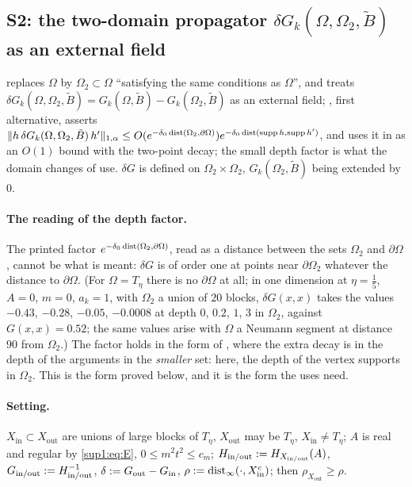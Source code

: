 
\subsection{S2: the two-domain propagator $\delta G_k(\Omega,\Omega_2,\tilde B)$ as an external field}\label{sup1:ssec:S2}

\cite[p.~414]{Ba3} replaces $\Omega$ by $\Omega_2\subset\Omega$ ``satisfying the same conditions as $\Omega$'', and treats $\delta G_k(\Omega,\Omega_2,\tilde B)=G_k(\Omega,\tilde B)-G_k(\Omega_2,\tilde B)$ as an external field; \cite[(2.5)]{Ba3}, first alternative, asserts $\lVert h\,\delta G_k(\Omega,\Omega_2,\tilde B)\,h'\rVert_{1,\alpha}\le O(e^{-\delta_0\operatorname{dist}(\Omega_2,\partial\Omega)})e^{-\delta_0\operatorname{dist}(\operatorname{supp} h,\operatorname{supp} h')}$, and \cite[p.~426]{Ba3} uses it in \cite[(2.13)]{Ba3} as an $O(1)$ bound with the two-point decay; the small depth factor is what the domain changes of \cite[pp.~421--422]{Ba3} use. $\delta G$ is defined on $\Omega_2\times\Omega_2$, $G_k(\Omega_2,\tilde B)$ being extended by $0$.

\paragraph{The reading of the depth factor.} The printed factor $e^{-\delta_0\operatorname{dist}(\Omega_2,\partial\Omega)}$, read as a distance between the sets $\Omega_2$ and $\partial\Omega$, cannot be what is meant: $\delta G$ is of order one at points near $\partial\Omega_2$ whatever the distance to $\partial\Omega$. (For $\Omega=T_\eta$ there is no $\partial\Omega$ at all; in one dimension at $\eta=\frac15$, $A=0$, $m=0$, $a_k=1$, with $\Omega_2$ a union of $20$ blocks, $\delta G(x,x)$ takes the values $-0.43$, $-0.28$, $-0.05$, $-0.0008$ at depth $0$, $0.2$, $1$, $3$ in $\Omega_2$, against $G(x,x)=0.52$; the same values arise with $\Omega$ a Neumann segment at distance $90$ from $\Omega_2$.) The factor holds in the form of \cite[Prop.~2.1, (2.26)]{Ba1}, where the extra decay is in the depth of the arguments in the \emph{smaller} set: here, the depth of the vertex supports in $\Omega_2$. This is the form proved below, and it is the form the uses need.

\paragraph{Setting.} $X_{\mathrm{in}}\subset X_{\mathrm{out}}$ are unions of large blocks of $T_\eta$, $X_{\mathrm{out}}$ may be $T_\eta$, $X_{\mathrm{in}}\ne T_\eta$; $A$ is real and regular by \eqref{sup1:eq:E}, $0\le m^2t^2\le c_m$; $H_{\mathrm{in/out}}:= H_{X_{\mathrm{in/out}}}(A)$, $G_{\mathrm{in/out}}:= H_{\mathrm{in/out}}^{-1}$, $\delta:= G_{\mathrm{out}}-G_{\mathrm{in}}$, $\rho:=\operatorname{dist}_\infty(\cdot,X_{\mathrm{in}}^c)$; then $\rho_{X_{\mathrm{out}}}\ge\rho$.

